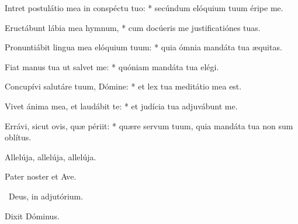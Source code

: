 Intret postulátio mea in conspéctu tuo: * secúndum elóquium tuum éripe me.

Eructábunt lábia mea hymnum, * cum docúeris me justificatiónes tuas.

Pronuntiábit lingua mea elóquium tuum: * quia ómnia mandáta tua æquitas.

Fiat manus tua ut salvet me: * quóniam mandáta tua elégi.

Concupívi salutáre tuum, Dómine: * et lex tua meditátio mea est.

Vivet ánima mea, et laudábit te: * et judícia tua adjuvábunt me.

Errávi, sicut ovis, quæ périit: * quære servum tuum, quia mandáta tua non sum oblítus.



 Allelúja, allelúja, allelúja.


\sectionornament




Pater noster et Ave.

\V\ Deus, in adjutórium.

  Dixit Dóminus. \textdagger

